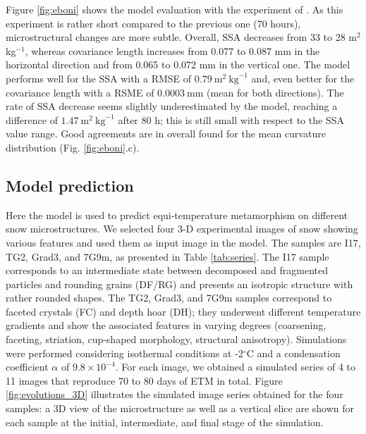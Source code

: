 \documentclass[draft,ms]{agujournal2019}
\begin{document}
Figure \ref{fig:eboni} shows the model evaluation with the experiment of . As this experiment is rather short compared to the previous one (70 hours), microstructural changes are more subtle. Overall, SSA decreases from 33 to 28 m$^2$ kg$^{-1}$, whereas covariance length increases from 0.077 to 0.087 mm in the horizontal direction and from 0.065 to 0.072 mm in the vertical one. The model performs well for the SSA with a RMSE of $0.79\ \mathrm{m}^2\ \mathrm{kg}^{-1}$ and, even better for the covariance length with a RSME of $0.0003\ \mathrm{mm}$ (mean for both directions).
The rate of SSA decrease seems slightly underestimated by the model, reaching a difference of $1.47\ \mathrm{m}^2\ \mathrm{kg}^{-1}$ after 80 h; this is still small with respect to the SSA value range. Good agreements are in overall found for the mean curvature distribution (Fig. \ref{fig:eboni}.c). \\


\subsection{Model prediction}
\label{sec:prediction}

Here the model is used to predict equi-temperature metamorphism on different snow microstructures. We selected four 3-D experimental images of snow showing various features and used them as input image in the model. The samples are I17, TG2, Grad3, and 7G9m, as presented in Table \ref{tab:series}.
The I17 sample corresponds to an intermediate state between decomposed and fragmented particles and rounding grains (DF/RG) and presents an isotropic structure with rather rounded shapes. The TG2, Grad3, and 7G9m samples correspond to faceted crystals (FC) and depth hoar (DH); they underwent different temperature gradients and show the associated features in varying degrees (coarsening, faceting, striation, cup-shaped morphology, structural anisotropy). Simulations were performed considering isothermal conditions at -2$^\circ$C and a condensation coefficient $\alpha$ of $9.8\times 10^{-4}$. For each image, we obtained a simulated series of 4 to 11 images that reproduce 70 to 80 days of ETM in total. Figure \ref{fig:evolutions_3D} illustrates the simulated image series obtained for the four samples: a 3D view of the microstructure as well as a vertical slice are shown for each sample at the initial, intermediate, and final stage of the simulation.\\
\end{document}
